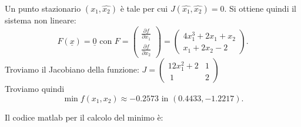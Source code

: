 Un punto stazionario $(\hat{x_1}, \hat{x_2})$ è tale per cui $J(\hat{x_1},\hat{x_2})=0$. Si ottiene quindi il sistema non lineare:
$$F(\underline{x})=\underline{0}\mbox{ con }F=\begin{pmatrix}\frac{\partial f}{\partial x_1}\\\frac{\partial f}{\partial x_2}\end{pmatrix}=\begin{pmatrix}4x_1^3+2x_1+x_2\\x_1+2x_2-2\end{pmatrix}.$$
Troviamo il Jacobiano della funzione: \( J=\begin{pmatrix} 12x_1^2+2 & 1  \\\ 1 & 2 \end{pmatrix} \)\\

Troviamo quindi $$\min{f(x_1,x_2)}\approx -0.2573\mbox{ in }(0.4433, -1.2217).$$


Il codice matlab per il calcolo del minimo è:

